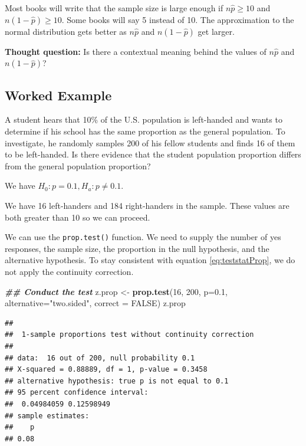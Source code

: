 \documentclass[
]{book}
\newenvironment{Shaded}{\begin{snugshade}}{\end{snugshade}}
\newcommand{\AttributeTok}[1]{\textcolor[rgb]{0.13,0.29,0.53}{#1}}
\newcommand{\ConstantTok}[1]{\textcolor[rgb]{0.56,0.35,0.01}{#1}}
\newcommand{\DecValTok}[1]{\textcolor[rgb]{0.00,0.00,0.81}{#1}}
\newcommand{\DocumentationTok}[1]{\textcolor[rgb]{0.56,0.35,0.01}{\textbf{\textit{#1}}}}
\newcommand{\FloatTok}[1]{\textcolor[rgb]{0.00,0.00,0.81}{#1}}
\newcommand{\FunctionTok}[1]{\textcolor[rgb]{0.13,0.29,0.53}{\textbf{#1}}}
\newcommand{\NormalTok}[1]{#1}
\newcommand{\OtherTok}[1]{\textcolor[rgb]{0.56,0.35,0.01}{#1}}
\newcommand{\StringTok}[1]{\textcolor[rgb]{0.31,0.60,0.02}{#1}}
\theoremstyle{definition}
\theoremstyle{definition}
\theoremstyle{definition}
\theoremstyle{definition}
\theoremstyle{remark}
\begin{document}
Most books will write that the sample size is large enough if \(n \hat{p} \geq 10\) and \(n(1-\hat{p}) \geq 10\). Some books will say 5 instead of 10. The approximation to the normal distribution gets better as \(n\hat{p}\) and \(n(1-\hat{p})\) get larger.

\textbf{Thought question:} Is there a contextual meaning behind the values of \(n\hat{p}\) and \(n(1-\hat{p})\)?

\hypertarget{worked-example-9}{%
\subsection{Worked Example}\label{worked-example-9}}

A student hears that 10\% of the U.S. population is left-handed and wants to determine if his school has the same proportion as the general population. To investigate, he randomly samples 200 of his fellow students and finds 16 of them to be left-handed. Is there evidence that the student population proportion differs from the general population proportion?

We have \(H_0: p = 0.1, H_a: p \neq 0.1\).

We have 16 left-handers and 184 right-handers in the sample. These values are both greater than 10 so we can proceed.

We can use the \texttt{prop.test()} function. We need to supply the number of yes responses, the sample size, the proportion in the null hypothesis, and the alternative hypothesis. To stay consistent with equation \eqref{eq:teststatProp}, we do not apply the continuity correction.

\begin{Shaded}
\begin{Highlighting}[]
\DocumentationTok{\#\# Conduct the test}
\NormalTok{z.prop }\OtherTok{\textless{}{-}} \FunctionTok{prop.test}\NormalTok{(}\DecValTok{16}\NormalTok{, }\DecValTok{200}\NormalTok{, }\AttributeTok{p=}\FloatTok{0.1}\NormalTok{, }\AttributeTok{alternative=}\StringTok{"two.sided"}\NormalTok{, }\AttributeTok{correct =} \ConstantTok{FALSE}\NormalTok{)}
\NormalTok{z.prop}
\end{Highlighting}
\end{Shaded}

\begin{verbatim}
## 
##  1-sample proportions test without continuity correction
## 
## data:  16 out of 200, null probability 0.1
## X-squared = 0.88889, df = 1, p-value = 0.3458
## alternative hypothesis: true p is not equal to 0.1
## 95 percent confidence interval:
##  0.04984059 0.12598949
## sample estimates:
##    p 
## 0.08
\end{verbatim}
\end{document}
